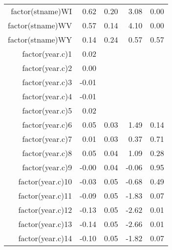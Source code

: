 \begin{table}[ht]
\begin{tabular}{rrrrr}
  factor(stname)WI & 0.62 & 0.20 & 3.08 & 0.00 \\ 
  factor(stname)WV & 0.57 & 0.14 & 4.10 & 0.00 \\ 
  factor(stname)WY & 0.14 & 0.24 & 0.57 & 0.57 \\ 
  factor(year.c)1 & 0.02 &  &  &  \\ 
  factor(year.c)2 & 0.00 &  &  &  \\ 
  factor(year.c)3 & -0.01 &  &  &  \\ 
  factor(year.c)4 & -0.01 &  &  &  \\ 
  factor(year.c)5 & 0.02 &  &  &  \\ 
  factor(year.c)6 & 0.05 & 0.03 & 1.49 & 0.14 \\ 
  factor(year.c)7 & 0.01 & 0.03 & 0.37 & 0.71 \\ 
  factor(year.c)8 & 0.05 & 0.04 & 1.09 & 0.28 \\ 
  factor(year.c)9 & -0.00 & 0.04 & -0.06 & 0.95 \\ 
  factor(year.c)10 & -0.03 & 0.05 & -0.68 & 0.49 \\ 
  factor(year.c)11 & -0.09 & 0.05 & -1.83 & 0.07 \\ 
  factor(year.c)12 & -0.13 & 0.05 & -2.62 & 0.01 \\ 
  factor(year.c)13 & -0.14 & 0.05 & -2.66 & 0.01 \\ 
  factor(year.c)14 & -0.10 & 0.05 & -1.82 & 0.07 \\ 
   \hline
\end{tabular}
\end{table}
